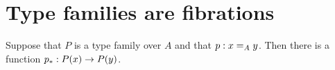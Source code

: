 \documentclass[hott-all.tex]{subfiles}
\begin{document}
\section{Type families are fibrations}
\label{sec:fibrations}

%

\begin{lem}[Transport]\label{lem:transport}
  Suppose that $P$ is a type family over $A$ and that $p:\id[A]xy$.
  Then there is a function $\transf{p}:P(x)\to P(y)$.
\end{lem}
\end{document}
